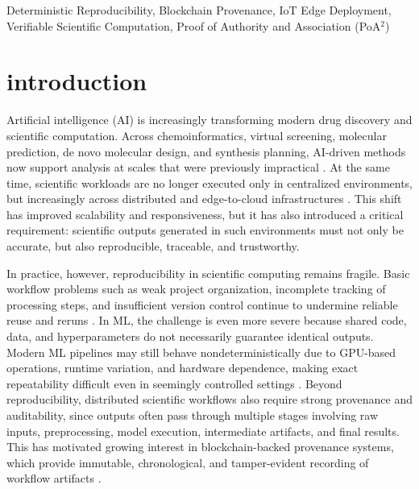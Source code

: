 \documentclass[conference]{IEEEtran}
\begin{document}
\begin{IEEEkeywords}
Deterministic Reproducibility, Blockchain Provenance,
IoT Edge Deployment, Verifiable Scientific Computation,
Proof of Authority and Association (PoA$^2$)
\end{IEEEkeywords}


\section{\textbf{introduction}}
\label{int}

Artificial intelligence (AI) is increasingly transforming modern drug discovery and scientific computation. Across chemoinformatics, virtual screening, molecular prediction, de novo molecular design, and synthesis planning, AI-driven methods now support analysis at scales that were previously impractical \cite{jimenez2021artificial,gentile2022artificial}. At the same time, scientific workloads are no longer executed only in centralized environments, but increasingly across distributed and edge-to-cloud infrastructures \cite{rosendo2022distributed}. This shift has improved scalability and responsiveness, but it has also introduced a critical requirement: scientific outputs generated in such environments must not only be accurate, but also reproducible, traceable, and trustworthy.

In practice, however, reproducibility in scientific computing remains fragile. Basic workflow problems such as weak project organization, incomplete tracking of processing steps, and insufficient version control continue to undermine reliable reuse and reruns \cite{wilson2017good}. In ML, the challenge is even more severe because shared code, data, and hyperparameters do not necessarily guarantee identical outputs. Modern ML pipelines may still behave nondeterministically due to GPU-based operations, runtime variation, and hardware dependence, making exact repeatability difficult even in seemingly controlled settings \cite{mcdermott2021reproducibility,heumos2023mlf}. Beyond reproducibility, distributed scientific workflows also require strong provenance and auditability, since outputs often pass through multiple stages involving raw inputs, preprocessing, model execution, intermediate artifacts, and final results. This has motivated growing interest in blockchain-backed provenance systems, which provide immutable, chronological, and tamper-evident recording of workflow artifacts \cite{wittek2021blockchain,al2021scichain,fernando2019sciblock}.
\end{document}
